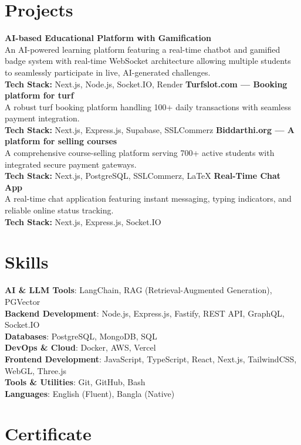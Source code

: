 \documentclass[11pt,a4paper]{article}
\begin{document}
\section{Projects}
\textbf{AI-based Educational Platform with Gamification}\\
An AI-powered learning platform featuring a real-time chatbot and gamified badge system with real-time WebSocket architecture allowing multiple students to seamlessly participate in live, AI-generated challenges.\\
\textbf{Tech Stack:} Next.js, Node.js, Socket.IO, Render
\vspace{4pt}
\textbf{Turfslot.com — Booking platform for turf}\\
A robust turf booking platform handling 100+ daily transactions with seamless payment integration.\\
\textbf{Tech Stack:} Next.js, Express.js, Supabase, SSLCommerz
\vspace{4pt}
\textbf{Biddarthi.org — A platform for selling courses}\\
A comprehensive course-selling platform serving 700+ active students with integrated secure payment gateways.\\
\textbf{Tech Stack:} Next.js, PostgreSQL, SSLCommerz, LaTeX
\vspace{4pt}
\textbf{Real-Time Chat App}\\
A real-time chat application featuring instant messaging, typing indicators, and reliable online status tracking.\\
\textbf{Tech Stack:} Next.js, Express.js, Socket.IO
\vspace{4pt}


\section{Skills}
\textbf{AI \& LLM Tools}: LangChain, RAG (Retrieval-Augmented Generation), PGVector\\
\textbf{Backend Development}: Node.js, Express.js, Fastify, REST API, GraphQL, Socket.IO\\
\textbf{Databases}: PostgreSQL, MongoDB, SQL\\
\textbf{DevOps \& Cloud}: Docker, AWS, Vercel\\
\textbf{Frontend Development}: JavaScript, TypeScript, React, Next.js, TailwindCSS, WebGL, Three.js\\
\textbf{Tools \& Utilities}: Git, GitHub, Bash\\
\textbf{Languages}: English (Fluent), Bangla (Native)

\section{Certificate}
\end{document}
